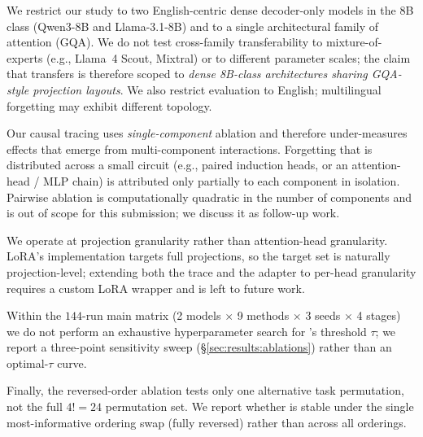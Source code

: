 \label{sec:limitations}

We restrict our study to two English-centric dense decoder-only models in the $8$B class (Qwen3-8B and Llama-3.1-8B) and to a single architectural family of attention (GQA). We do not test cross-family transferability to mixture-of-experts (e.g., Llama~4 Scout, Mixtral) or to different parameter scales; the claim that \fvs{} transfers is therefore scoped to \textit{dense 8B-class architectures sharing GQA-style projection layouts}. We also restrict evaluation to English; multilingual forgetting may exhibit different topology.

Our causal tracing uses \textit{single-component} ablation and therefore under-measures effects that emerge from multi-component interactions. Forgetting that is distributed across a small circuit (e.g., paired induction heads, or an attention-head / MLP chain) is attributed only partially to each component in isolation. Pairwise ablation is computationally quadratic in the number of components and is out of scope for this submission; we discuss it as follow-up work.

We operate at projection granularity rather than attention-head granularity. LoRA's implementation targets full projections, so the \tglora{} target set is naturally projection-level; extending both the trace and the adapter to per-head granularity requires a custom LoRA wrapper and is left to future work.

Within the $144$-run main matrix (2 models $\times$ 9 methods $\times$ 3 seeds $\times$ 4 stages) we do not perform an exhaustive hyperparameter search for \tglora{}'s threshold $\tau$; we report a three-point sensitivity sweep (\S\ref{sec:results:ablations}) rather than an optimal-$\tau$ curve.

Finally, the reversed-order ablation tests only one alternative task permutation, not the full $4! = 24$ permutation set. We report whether \fvs{} is stable under the single most-informative ordering swap (fully reversed) rather than across all orderings.
